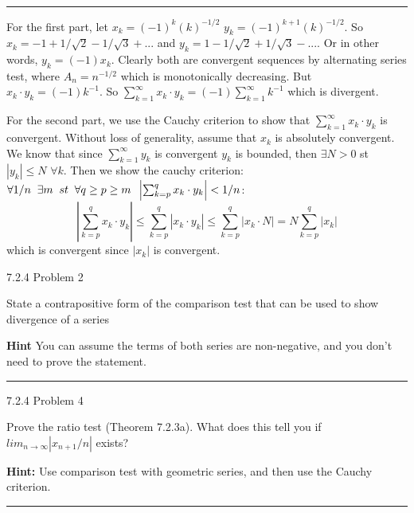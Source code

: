 \documentclass[11pt]{article}
\begin{document}
\hrule

For the first part, let $x_k = (-1)^k (k)^{-1/2}$ $y_k = (-1)^{k+1} (k)^{-1/2}$.
So $x_k = -1 + 1/\sqrt{2} - 1/\sqrt{3} + ...$ and $y_k = 1 - 1/\sqrt{2} + 1/\sqrt{3} - ...$.
Or in other words, $y_k = (-1) x_k$. Clearly both are convergent sequences by alternating series test,
where $A_n = n^{-1/2}$ which is monotonically decreasing. But $x_k \cdot y_k = (-1) k^{-1}$. So
$\sum_{k = 1} ^\infty x_k \cdot y_k = (-1) \sum_{k = 1} ^\infty k^{-1}$ which is divergent.


For the second part, we use the Cauchy criterion to show that $\sum_{k = 1} ^\infty x_k \cdot y_k$ is convergent.
Without loss of generality, assume that $x_k$ is absolutely convergent. We know that since $\sum_{k = 1} ^\infty y_k$ is convergent $y_k$ is bounded,
then $\exists N > 0$ st $|y_k| \leq N$ $\forall k$. Then we show the cauchy criterion: $\forall 1/n \sp \exists m \sp st \sp \forall q \geq p \geq m \sp \left| \sum_{k = p} ^q x_k \cdot y_k \right| < 1/n$: 
$$ \left| \sum_{k = p} ^q x_k \cdot y_k \right| \leq  \sum_{k = p} ^q \left| x_k \cdot y_k \right| \leq \sum_{k = p} ^q \left| x_k \cdot N \right| = N \sum_{k = p} ^q \left| x_k \right|$$
which is convergent since $|x_k|$ is convergent.






 7.2.4 Problem 2

State a contrapositive form of the comparison test that can be used to show divergence of a series

\textbf{Hint} You can assume the terms of both series are non-negative, and you don't need to prove the statement.



\hrule





 7.2.4 Problem 4

Prove the ratio test (Theorem 7.2.3a). What does this tell you if $lim_{n \to \infty} |x_{n+1} / n|$ exists?

\textbf{Hint: } Use comparison test with geometric series, and then use the Cauchy criterion.

\hrule
\end{document}

